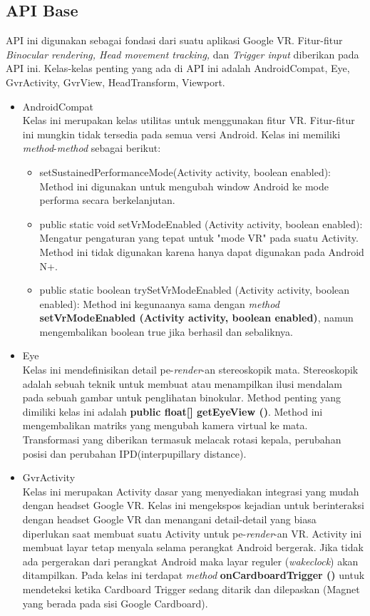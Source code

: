 \subsection{API Base}
\label{sec:api_base}

API ini digunakan sebagai fondasi dari suatu aplikasi Google VR. Fitur-fitur \textit{Binocular rendering, Head movement tracking,} dan \textit{Trigger input} diberikan pada API ini. Kelas-kelas penting yang ada di API ini adalah AndroidCompat, Eye, GvrActivity, GvrView, HeadTransform, Viewport.
\begin{itemize}
	\item AndroidCompat\\
Kelas ini merupakan kelas utilitas untuk menggunakan fitur VR. Fitur-fitur ini mungkin tidak tersedia pada semua versi Android. Kelas ini memiliki \textit{method}-\textit{method} sebagai berikut:
\begin{itemize}
	\item setSustainedPerformanceMode(Activity activity, boolean enabled): \\
	Method ini digunakan untuk mengubah window Android ke mode performa secara berkelanjutan.
	\item public static void setVrModeEnabled (Activity activity, boolean enabled): \\
	Mengatur pengaturan yang tepat untuk "mode VR" pada suatu Activity. Method ini tidak digunakan karena hanya dapat digunakan pada Android N+.
	\item public static boolean trySetVrModeEnabled (Activity activity, boolean enabled): 
	Method ini kegunaanya sama dengan \textit{method} \textbf{setVrModeEnabled (Activity activity, boolean enabled)}, namun mengembalikan boolean true jika berhasil dan sebaliknya.
\end{itemize}
	\item Eye\\
Kelas ini mendefinisikan detail pe-\textit{render}-an stereoskopik mata. Stereoskopik adalah sebuah teknik untuk membuat atau menampilkan ilusi mendalam pada sebuah gambar untuk penglihatan binokular. Method penting yang dimiliki kelas ini adalah \textbf{public float[] getEyeView ()}. Method ini mengembalikan matriks yang mengubah kamera virtual ke mata. Transformasi yang diberikan termasuk melacak rotasi kepala, perubahan posisi dan perubahan IPD(interpupillary distance).
	\item GvrActivity\\
Kelas ini merupakan Activity dasar yang menyediakan integrasi yang mudah dengan headset Google VR. Kelas ini mengekspos kejadian untuk berinteraksi dengan headset Google VR dan menangani detail-detail yang biasa diperlukan saat membuat suatu Activity untuk pe-\textit{render}-an VR. Activity ini membuat layar tetap menyala selama perangkat Android bergerak. Jika tidak ada pergerakan dari perangkat Android maka layar reguler (\textit{wakeclock}) akan ditampilkan. Pada kelas ini terdapat \textit{method} \textbf{onCardboardTrigger ()} untuk mendeteksi ketika Cardboard Trigger sedang ditarik dan dilepaskan (Magnet yang berada pada sisi Google Cardboard).

\end{itemize}

